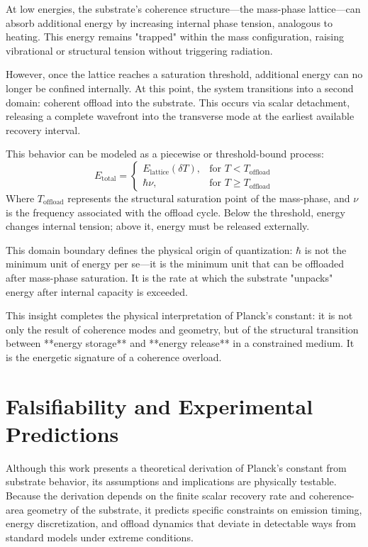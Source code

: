 \documentclass[ht-mathphys]{ht-fmt}
\theoremstyle{thmstyleone}%
\theoremstyle{thmstyletwo}%
\theoremstyle{thmstylethree}%
\begin{document}
At low energies, the substrate’s coherence structure—the mass-phase lattice—can absorb additional energy by increasing internal phase tension, analogous to heating. This energy remains "trapped" within the mass configuration, raising vibrational or structural tension without triggering radiation.

However, once the lattice reaches a saturation threshold, additional energy can no longer be confined internally. At this point, the system transitions into a second domain: coherent offload into the substrate. This occurs via scalar detachment, releasing a complete wavefront into the transverse mode at the earliest available recovery interval.

This behavior can be modeled as a piecewise or threshold-bound process:
\[
E_{\text{total}} =
\begin{cases}
E_{\text{lattice}}(\delta T), & \text{for } T < T_{\text{offload}} \\
\hbar \nu, & \text{for } T \geq T_{\text{offload}}
\end{cases}
\]
Where $T_{\text{offload}}$ represents the structural saturation point of the mass-phase, and $\nu$ is the frequency associated with the offload cycle. Below the threshold, energy changes internal tension; above it, energy must be released externally.

This domain boundary defines the physical origin of quantization: $\hbar$ is not the minimum unit of energy per se—it is the minimum unit that can be offloaded after mass-phase saturation. It is the rate at which the substrate "unpacks" energy after internal capacity is exceeded.

This insight completes the physical interpretation of Planck’s constant: it is not only the result of coherence modes and geometry, but of the structural transition between **energy storage** and **energy release** in a constrained medium. It is the energetic signature of a coherence overload.


\section{Falsifiability and Experimental Predictions}

Although this work presents a theoretical derivation of Planck’s constant from substrate behavior, its assumptions and implications are physically testable. Because the derivation depends on the finite scalar recovery rate and coherence-area geometry of the substrate, it predicts specific constraints on emission timing, energy discretization, and offload dynamics that deviate in detectable ways from standard models under extreme conditions.
\end{document}

